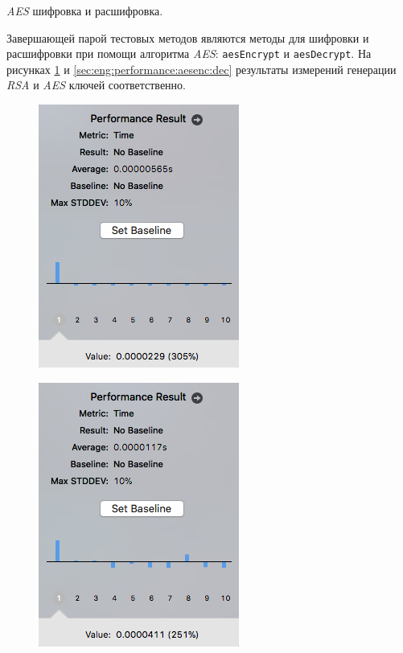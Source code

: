 \subsubsection{} \textit{AES} шифровка и расшифровка.
\label{sec:eng:performance:aesenc}

Завершающей парой тестовых методов являются методы для шифровки и расшифровки при помощи алгоритма \textit{AES}: \texttt{aesEncrypt} и \texttt{aesDecrypt}. На рисунках \ref{sec:eng:performance:aesenc:enc} и \ref{sec:eng:performance:aesenc:dec} результаты измерений генерации \textit{RSA} и \textit{AES} ключей соответственно.

\begin{figure}[h]
\centering
\begin{minipage}{.5\textwidth}
  \centering
  \includegraphics[width=.65\linewidth]{inc/img/perf/testAESEncryptPerformance.png}
  \label{sec:eng:performance:aesenc:enc}
\end{minipage}%
\begin{minipage}{.5\textwidth}
  \centering
  \includegraphics[width=.65\linewidth]{inc/img/perf/testAESDecryptPerformance.png}

\end{minipage}
\end{figure}
